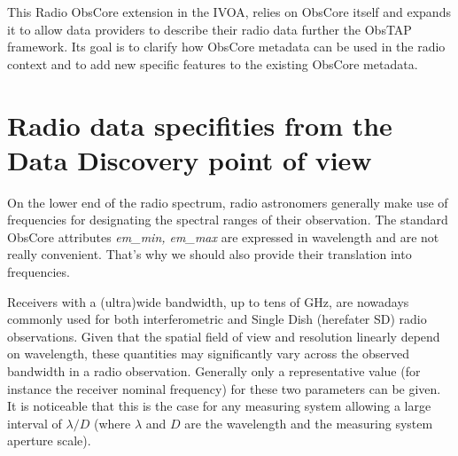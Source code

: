 \documentclass[11pt,a4paper]{ivoa}
\begin{document}





This Radio ObsCore extension in the IVOA, relies  on ObsCore itself and expands it
to allow data providers to describe their radio data further the  ObsTAP framework.
Its goal is to clarify how  ObsCore metadata  can be used in the  radio context and to add new specific features to the existing ObsCore metadata.


\section{Radio data specifities from the Data Discovery point of view}
\label{sec:specificities}


On the lower end of the radio spectrum, radio astronomers generally make use of
frequencies for designating the spectral ranges of their observation. The standard
ObsCore attributes \emph{em\_min, em\_max} are expressed in wavelength and are not really convenient.
That's why we should also provide their translation into frequencies.

Receivers with a (ultra)wide bandwidth, up to tens of GHz, are
nowadays commonly used for both interferometric and Single Dish (herefater SD) radio observations.
Given that the spatial field of view and resolution linearly depend on wavelength, these quantities may significantly vary across the observed bandwidth in a radio observation.
Generally only a representative value (for instance the
receiver nominal frequency) for these two parameters can be given. It is
noticeable that this is the case for any measuring system allowing a large interval of
$\lambda/D$ (where $\lambda$ and $D$ are the wavelength and the measuring system
aperture scale).
 
\end{document}
